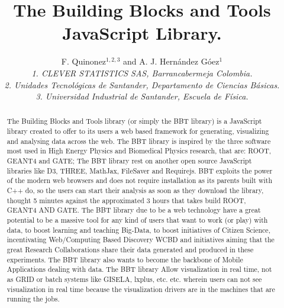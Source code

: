 \documentclass[12pt,twoside,a4paper]{article}
\begin{document}
\title{\color{blue}The Building Blocks and Tools JavaScript Library.}
\author{F. Quinonez$^{1,2,3}$ and A. J. Hern\'{a}ndez G\'{o}ez$^{1}$\\
  \small{\em{1. CLEVER STATISTICS SAS, Barrancabermeja Colombia.}}\\
\small{\em{2. Unidades Tecnol\'ogicas de Santander, Departamento de Ciencias B\'asicas.}}\\
\small{\em{3. Universidad Industrial de Santander, Escuela de F\'isica.}}
}
\maketitle
\begin{abstract}
The Building Blocks and Tools library (or simply the BBT library) is a JavaScript
library created to offer to its users a web based framework for generating, visualizing and analysing data across the web. The BBT library is
inspired by the three software most used in High Energy Physics and Biomedical Physics research, that are: ROOT, GEANT4 and GATE;
The BBT library rest on another open source JavaScript libraries like D3, THREE, MathJax, FileSaver
and Requirejs. BBT exploits the power of the modern web browsers
and does not require installation as its parents built with C++ do, so
the users can start their analysis as soon as they download the library, thought 5 minutes against the approximated 3 hours that takes build 
ROOT, GEANT4 AND GATE.
The BBT library due to be a web technology have a great potential to be a
massive tool for any kind of users that want to work (or play) with data, to
boost learning and teaching Big-Data, to boost initiatives of Citizen
Science, incentivating Web/Computing Based Discovery WCBD and initiatives aiming that the great Research Collaborations share
their data generated and produced in these experiments. The BBT library also wants to become the backbone of Mobile Applications dealing with data. 
The BBT library Allow visualization in real time, not as GRID or batch systems like GISELA,
lxplus, etc. etc. wherein users can not see visualization in real time because the visualization drivers are in the machines that are running the jobs.
\end{abstract}
\end{document}
